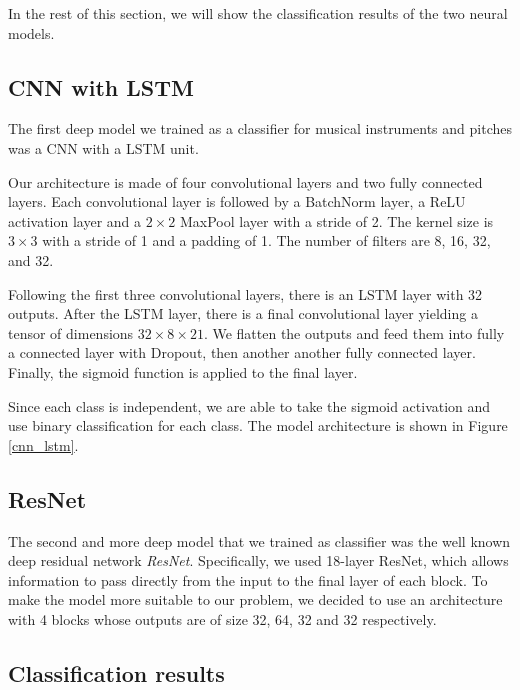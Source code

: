 \documentclass{article}
\begin{document}
In the rest of this section, we will show the classification results of the two neural models. 

\subsection{CNN with LSTM}

The first deep model we trained as a classifier for musical instruments and pitches was a CNN with a LSTM unit. 


Our architecture is made of four convolutional layers and two fully connected layers. Each convolutional layer is followed by a BatchNorm layer, a ReLU activation layer and a $2 \times 2$  MaxPool layer with a stride of 2. The kernel size is $3 \times 3$ with a stride of 1 and a padding of 1. The number of filters are 8, 16, 32, and 32.

Following the first three convolutional layers, there is an LSTM layer with 32 outputs. After the LSTM layer, there is a final convolutional layer yielding a tensor of dimensions $32\times 8 \times 21$. We flatten the outputs and feed them into fully a connected layer with Dropout, then another another fully connected layer. Finally, the sigmoid function is applied to the final layer. 

Since each class is independent, we are able to take the sigmoid activation and use binary classification for each class. The model architecture is shown in Figure \ref{cnn_lstm}.

\subsection{ResNet}

The second and more deep model that we trained as classifier was the well known deep residual network \emph{ResNet}. Specifically, we used 18-layer ResNet, which allows information to pass directly from the input to the final layer of each block. To make the model more suitable to our problem, we decided to use an architecture with 4 blocks whose outputs are of size 32, 64, 32 and 32 respectively.

\subsection{Classification results}
\end{document}

